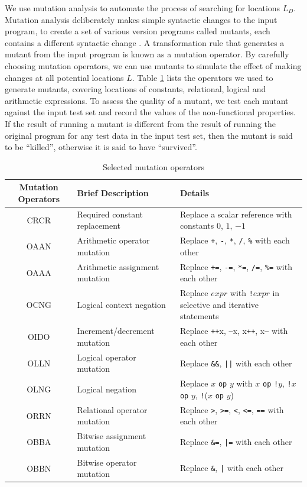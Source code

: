 We use mutation analysis to automate the process of searching for locations $L_D$. Mutation analysis deliberately makes simple syntactic changes to the input program, to create a set of various version programs called mutants, each contains a different syntactic change \cite{5487526}. A transformation rule that generates a mutant from the input program is known as a mutation operator. By carefully choosing mutation operators, we can use mutants to simulate the effect of making changes at all potential locations $L$. Table \ref{tab:cmop} lists the operators we used to generate mutants, covering locations of constants, relational, logical and arithmetic expressions. 
To assess the quality of a mutant, we test each mutant against the input test set and record the values of the non-functional properties. If the result of running a mutant is different from the result of running the original program for any test data in the input test set, then the mutant is said to be ``killed'', otherwise it is said to have ``survived''. 

\begin{table} [ht]
\caption{Selected mutation operators}
\label{tab:cmop} 
\begin{center}
\begin{tabular}{ | c | l | l |}
  \hline
  Mutation Operators & Brief Description & Details \\ 
\hline
  CRCR & Required constant replacement & Replace a scalar reference with constants $0$, $1$, $-1$ \\
  OAAN & Arithmetic operator mutation & Replace \texttt{+}, \texttt{-}, \texttt{*}, \texttt{/}, \texttt{\%} with each other \\
  OAAA & Arithmetic assignment mutation & Replace \texttt{+=}, \texttt{-=}, \texttt{*=}, \texttt{/=}, \texttt{\%=} with each other \\
  OCNG & Logical context negation & Replace $expr$ with \texttt{!}$expr$ in selective and iterative statements\\
  OIDO & Increment/decrement mutation  & Replace \texttt{++}x, \texttt{--}x, x\texttt{++}, x\texttt{--} with each other \\
  OLLN & Logical operator mutation  & Replace \texttt{\&\&}, \texttt{||} with each other \\ 
  OLNG & Logical negation & Replace $x$ \texttt{op} $y$ with $x$ \texttt{op} \texttt{!}$y$, \texttt{!}$x$ \texttt{op} $y$, \texttt{!}($x$ \texttt{op} $y$)\\
  ORRN & Relational operator mutation & Replace \texttt{>}, \texttt{>=}, \texttt{<}, \texttt{<=}, \texttt{==} with each other \\
  OBBA & Bitwise assignment mutation & Replace \texttt{\&=}, \texttt{|=} with each other \\
  OBBN & Bitwise operator mutation & Replace \texttt{\&}, \texttt{|} with each other \\
\hline
\end{tabular} 
\end{center} 
\end{table} 


